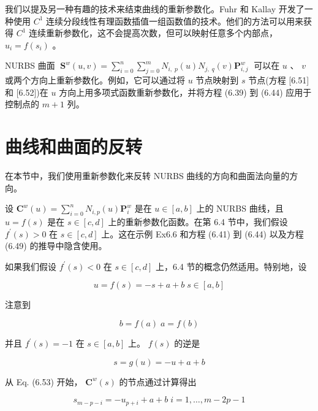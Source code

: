 \documentclass[../main.tex]{subfiles}
\begin{document}
我们以提及另一种有趣的技术来结束曲线的重新参数化。Fuhr 和 Kallay \cite{Fuhr92} 开发了一种使用 \({C}^{1}\) 连续分段线性有理函数插值一组函数值的技术。他们的方法可以用来获得 \({C}^{1}\) 连续重新参数化，这不会提高次数，但可以映射任意多个内部点， \({u}_{i} = f\left( {s}_{i}\right)\) 。

NURBS 曲面 \(\;{\mathbf{S}}^{w}\left( {u,v}\right)  = \mathop{\sum }\limits_{{i = 0}}^{n}\mathop{\sum }\limits_{{j = 0}}^{m}{N}_{i,\;p}\left( u\right) {N}_{j,\;q}\left( v\right) {\mathbf{P}}_{i,j}^{w}\;\) 可以在 \(u\) 、 \(v\) 或两个方向上重新参数化。例如，它可以通过将 \(u\) 节点映射到 \(s\) 节点(方程 [6.51] 和 [6.52])在 \(u\) 方向上用多项式函数重新参数化，并将方程 (6.39) 到 (6.44) 应用于控制点的 \(m + 1\) 列。



\section{曲线和曲面的反转}

在本节中，我们使用重新参数化来反转 NURBS 曲线的方向和曲面法向量的方向。

设 \({\mathbf{C}}^{w}\left( u\right)  = \mathop{\sum }\limits_{{i = 0}}^{n}{N}_{i,p}\left( u\right) {\mathbf{P}}_{i}^{w}\) 是在 \(u \in  \left\lbrack  {a,b}\right\rbrack\) 上的 NURBS 曲线，且 \(u = f\left( s\right)\) 是在 \(s \in  \left\lbrack  {c,d}\right\rbrack\) 上的重新参数化函数。在第 6.4 节中，我们假设 \({f}^{\prime }\left( s\right)  > 0\) 在 \(s \in  \left\lbrack  {c,d}\right\rbrack\) 上。这在示例 Ex6.6 和方程 (6.41) 到 (6.44) 以及方程 (6.49) 的推导中隐含使用。

如果我们假设 \({f}^{\prime }\left( s\right)  < 0\) 在 \(s \in  \left\lbrack  {c,d}\right\rbrack\) 上，6.4 节的概念仍然适用。特别地，设

\[
u = f\left( s\right)  =  - s + a + b\;s \in  \left\lbrack  {a,b}\right\rbrack   \tag{6.63}
\]

注意到

\[
b = f\left( a\right) \;a = f\left( b\right)  \tag{6.64}
\]

并且 \({f}^{\prime }\left( s\right)  =  - 1\) 在 \(s \in  \left\lbrack  {a,b}\right\rbrack\) 上。 \(f\left( s\right)\) 的逆是

\[
s = g\left( u\right)  =  - u + a + b \tag{6.65}
\]

从 Eq. (6.53) 开始， \({\mathbf{C}}^{w}\left( s\right)\) 的节点通过计算得出

\[
{s}_{m - p - i} =  - {u}_{p + i} + a + b\;i = 1,\ldots ,m - {2p} - 1 \tag{6.66}
\]
\end{document}

